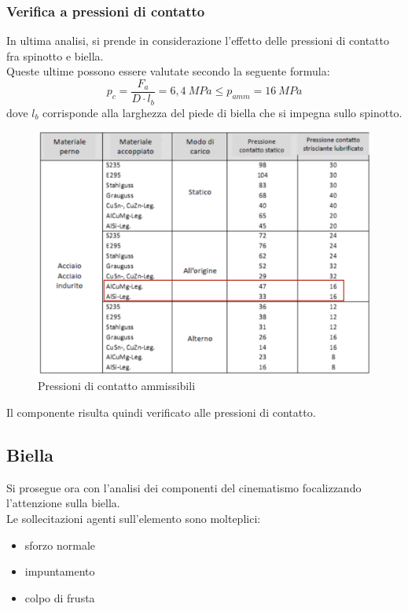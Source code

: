 \subsubsection{Verifica a pressioni di contatto}
In ultima analisi, si prende in considerazione l'effetto delle pressioni di contatto fra spinotto e biella.\\
Queste ultime possono essere valutate secondo la seguente formula:
\begin{equation}
    p_c=\frac{F_a}{D\cdot l_b}=6,4\ MPa\leq p_{amm}=16\ MPa
\end{equation}
dove $l_b$ corrisponde alla larghezza del piede di biella che si impegna sullo spinotto.
\begin{figure}[h]
    \centering
    \includegraphics[scale=0.2]{Immagini/PressioniContatto.jpeg}
    \caption{Pressioni di contatto ammissibili}
    \label{fig:PressioniContatto}
\end{figure}
Il componente risulta quindi verificato alle pressioni di contatto. 
\subsection{Biella}
Si prosegue ora con l'analisi dei componenti del cinematismo focalizzando l'attenzione sulla biella. \\
Le sollecitazioni agenti sull'elemento sono molteplici:
\begin{itemize}
    \item sforzo normale
    \item impuntamento
    \item colpo di frusta
\end{itemize}
